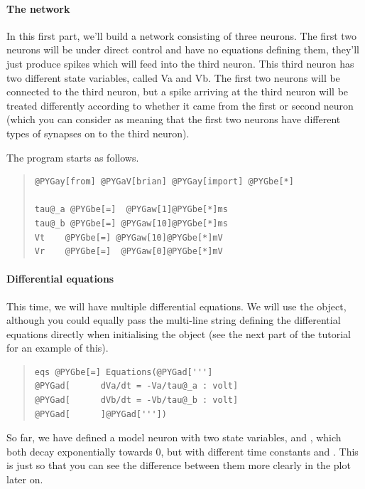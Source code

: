 \documentclass[letterpaper,10pt,english]{manual}
\begin{document}
\paragraph{The network}

In this first part, we'll build a network consisting of three neurons. The
first two neurons will be under direct control and have no equations
defining them, they'll just produce spikes which will feed into the third
neuron. This third neuron has two different state variables, called Va
and Vb. The first two neurons will be connected to the third neuron, but
a spike arriving at the third neuron will be treated differently
according to whether it came from the first or second neuron (which you
can consider as meaning that the first two neurons have different
types of synapses on to the third neuron).

The program starts as follows.
\begin{quote}

\begin{Verbatim}[commandchars=@\[\]]
@PYGay[from] @PYGaV[brian] @PYGay[import] @PYGbe[*]

tau@_a @PYGbe[=]  @PYGaw[1]@PYGbe[*]ms
tau@_b @PYGbe[=] @PYGaw[10]@PYGbe[*]ms
Vt    @PYGbe[=] @PYGaw[10]@PYGbe[*]mV
Vr    @PYGbe[=]  @PYGaw[0]@PYGbe[*]mV
\end{Verbatim}
\end{quote}


\paragraph{Differential equations}

This time, we will have multiple differential equations. We will use the
\hyperlink{brian.Equations}{} object, although you could equally pass the multi-line string
defining the differential equations directly when initialising the \hyperlink{brian.NeuronGroup}{}
object (see the next part of the tutorial for an example of this).
\begin{quote}

\begin{Verbatim}[commandchars=@\[\]]
eqs @PYGbe[=] Equations(@PYGad[''']
@PYGad[      dVa/dt = -Va/tau@_a : volt]
@PYGad[      dVb/dt = -Vb/tau@_b : volt]
@PYGad[      ]@PYGad['''])
\end{Verbatim}
\end{quote}

So far, we have defined a model neuron with two state variables, 
and , which both decay exponentially towards 0, but with different
time constants  and . This is just so that you can see
the difference between them more clearly in the plot later on.
\end{document}
